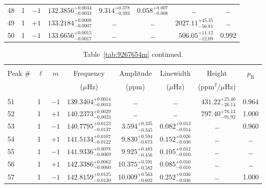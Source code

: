 \begin{table*}[!]
\begin{tabular}{llcrrlrc}
48 & 1 & $-1$ & $    132.3856_{-      0.0033}^{+      0.0034}$ & $       9.314_{-       0.393}^{+       0.378}$ & $       0.058_{-       0.008}^{+       0.007}$ & \multicolumn{1}{c}{\dots} & \dots \\[1pt]
49 & 1 & $+1$ & $    133.2184_{-      0.0007}^{+      0.0008}$ & \multicolumn{1}{c}{\dots} & \multicolumn{1}{c}{\dots} & $     2027.11_{-       56.81}^{+       45.35}$ & \dots \\[1pt]
50 & 1 & $-1$ & $    133.6656_{-      0.0017}^{+      0.0015}$ & \multicolumn{1}{c}{\dots} & \multicolumn{1}{c}{\dots} & $      506.05_{-       12.09}^{+       11.12}$ & 0.992\\[1pt]
\hline
\end{tabular}
\end{table*}


\begin{table*}[!]
\caption{Table~\ref{tab:9267654m} continued.}
\label{tab:9267654m2}
\centering
\begin{tabular}{llcrrlrc}
\hline\hline
\\[-8pt]          
Peak \# & $\ell$ & $m$ & \multicolumn{1}{c}{Frequency} & \multicolumn{1}{c}{Amplitude} & \multicolumn{1}{c}{Linewidth} & \multicolumn{1}{c}{Height}& $p_\mathrm{B}$\\
 & & & \multicolumn{1}{c}{($\mu$Hz)} & \multicolumn{1}{c}{(ppm)} & \multicolumn{1}{c}{($\mu$Hz)} & \multicolumn{1}{c}{(ppm$^2/\mu$Hz)}\\
\hline \\[-8pt]
51 & 1 & $-1$ & $    139.3404_{-      0.0013}^{+      0.0014}$ & \multicolumn{1}{c}{\dots} & \multicolumn{1}{c}{\dots} & $      431.22_{-       26.14}^{+       25.46}$ & 0.964\\[1pt]
52 & 1 & $+1$ & $    140.2373_{-      0.0023}^{+      0.0029}$ & \multicolumn{1}{c}{\dots} & \multicolumn{1}{c}{\dots} & $      797.40_{-       91.92}^{+       76.13}$ & 1.000 \\[1pt]
53 & 1 & $-1$ & $    140.7795_{-      0.0137}^{+      0.0123}$ & $       3.594_{-       0.345}^{+       0.335}$ & $       0.082_{-       0.014}^{+       0.013}$ & \multicolumn{1}{c}{\dots} & 0.960 \\[1pt]
54 & 1 & $+1$ & $    141.5134_{-      0.0122}^{+      0.0107}$ & $       9.830_{-       0.673}^{+       0.594}$ & $       0.152_{-       0.030}^{+       0.026}$ & \multicolumn{1}{c}{\dots} & \dots \\[1pt]
55 & 1 & $-1$ & $    141.9336_{-      0.0069}^{+      0.0078}$ & $       9.925_{-       0.456}^{+       0.483}$ & $       0.105_{-       0.010}^{+       0.012}$ & \multicolumn{1}{c}{\dots} & \dots \\[1pt]
56 & 1 & $+1$ & $    142.3386_{-      0.0060}^{+      0.0062}$ & $      10.375_{-       0.582}^{+       0.591}$ & $       0.085_{-       0.010}^{+       0.010}$ & \multicolumn{1}{c}{\dots} & \dots \\[1pt]
57 & 1 & $-1$ & $    142.8159_{-      0.0130}^{+      0.0125}$ & $      10.009_{-       0.602}^{+       0.563}$ & $       0.252_{-       0.036}^{+       0.036}$ & \multicolumn{1}{c}{\dots} & 1.000\\[1pt]


\end{tabular}
\end{table*}
